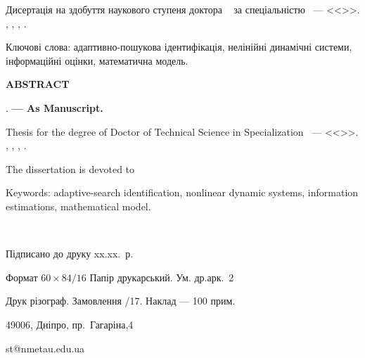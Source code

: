 \documentclass[a4paper,13pt]{atuaref}
\newcommand{\xsect}[1]{\medskip\begin{center}\textbf{#1}\end{center}\medskip\penalty10000}
\begin{document}
Дисертація на здобуття наукового ступеня
доктора
\dissScopeUa\ {}
за спеціальністю
\dissSpecId\ --- <<\dissSpecUa>>.
\institutionUa, \belongUa, \cityUa, \bookyear.


Ключові слова: адаптивно-пошукова ідентифікація, нелінійні динамічні
системи, інформаційні оцінки, математична модель.



\xsect{ABSTRACT}

\textbf{\dissauthorEn}
\textbf{\booknameEn}.
\textbf{--- As Manuscript.}

Thesis for the degree of Doctor of Technical Science in Specialization
\dissSpecId\ --- <<\dissSpecEn>>.
\institutionEn, \belongEn, \cityEn, \bookyear.

The dissertation is devoted to

Keywords: adaptive-search identification, nonlinear dynamic systems,
information estimations, mathematical model.

\clearpage

{~}
\vfill

\begin{center}


Підписано до друку xx.xx.\bookyear~р.

Формат $60 \times 84/16$  Папір друкарський. Ум. др.арк.~2

Друк різограф. Замовлення /17. Наклад --- 100 прим.


49006, Дніпро, пр.~Гагаріна,4

st@nmetau.edu.ua

\end{center}

\vfill
\end{document}

